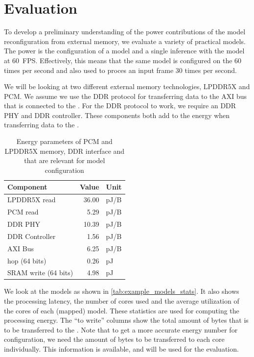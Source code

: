 \section{Evaluation}
To develop a preliminary understanding of the power contributions of the model reconfiguration from external memory, we evaluate a variety of practical models.
The power is the configuration of a model and a single inference with the model at \SI{60}{FPS}.
Effectively, this means that the same model is configured on the \graicore{} 60 times per second and also used to proces an input frame 30 times per second.

We will be looking at two different external memory technologies, LPDDR5X and PCM.
We assume we use the DDR protocol for transferring data to the AXI bus that is connected to the \graicore{}.
For the DDR protocol to work, we require an DDR PHY and DDR controller.
These components both add to the energy when transferring data to the \graicore{}.

\begin{table}[hbtp]
    \centering
    \begin{tabular}{@{}lrl@{}}
    \toprule
    \textbf{Component} & \textbf{Value} & \textbf{Unit} \\
    \midrule
    LPDDR5X read             & 36.00 & pJ/B \\
    PCM read                 & 5.29 & pJ/B  \\
    DDR PHY                  & 10.39 & pJ/B \\
    DDR Controller           & 1.56 & pJ/B  \\
    AXI Bus                  & 6.25 & pJ/B  \\
    \confignoc{} hop (64 bits) & 0.26 & pJ    \\
    SRAM write (64 bits)     & 4.98 & pJ    \\ \bottomrule
    \end{tabular}
    \caption{Energy parameters of PCM and LPDDR5X memory, DDR interface and \graicore{} that are relevant for model configuration}
    \label{tab:energy_parameters}
\end{table}

We look at the models as shown in \cref{tab:example_models_stats}.
It also shows the processing latency, the number of cores used and the average utilization of the cores of each (mapped) model.
These statistics are used for computing the processing energy.
The ``to write'' columns show the total amount of bytes that is to be transferred to the \graicore{}.
Note that to get a more accurate energy number for configuration, we need the amount of bytes to be transferred to each core individually.
This information is available, and will be used for the evaluation.

